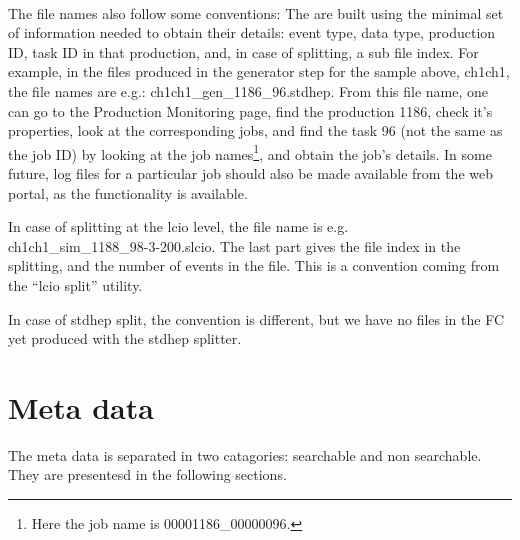 \documentclass[a4paper,12pt]{article}
\begin{document}
~\\

The file names also follow some conventions: The are built using the minimal set
of information needed to obtain their details: event type, data type, production
ID, task ID in that production, and, in case of splitting, a sub file index. For example,
in the files produced in the generator step for the sample above, ch1ch1, the
file names are e.g.: ch1ch1\_gen\_1186\_96.stdhep. From this file name, one
can go to the Production Monitoring page, find the production 1186, check it's
properties, look at the corresponding jobs, and find the task 96 (not the same
as the job ID) by looking at the job names\footnote{Here the job name is
00001186\_00000096.}, and obtain the job's details. In some future, log files
for a particular job should also be made available from the web portal, as the
functionality is available.

In case of splitting at the lcio level, the file name is e.g.\\
ch1ch1\_sim\_1188\_98-3-200.slcio. The last part gives the file index in the
splitting, and the number of events in the file. This is a convention
coming from the ``lcio split'' utility. 

In case of stdhep split, the convention is different, but we have no files in
the FC yet produced with the stdhep splitter.

\section{Meta data}
The meta data is separated in two catagories: searchable and non searchable.
They are presentesd in the following sections.
\end{document}
